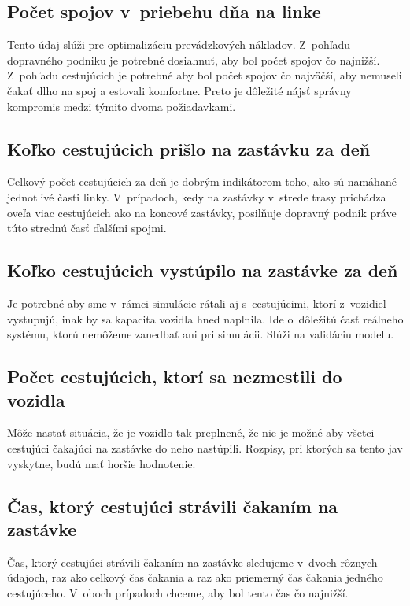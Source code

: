 \subsection*{Počet spojov v~priebehu dňa na linke}
Tento údaj slúži pre optimalizáciu prevádzkových nákladov. Z~pohľadu dopravného podniku je potrebné dosiahnuť, aby bol počet spojov čo najnižší.
Z~pohľadu cestujúcich je potrebné aby bol počet spojov čo najväčší, aby nemuseli čakať dlho na spoj a estovali komfortne.
Preto je dôležité nájsť správny kompromis medzi týmito dvoma požiadavkami.

\subsection*{Koľko cestujúcich prišlo na zastávku za deň}
Celkový počet cestujúcich za deň je dobrým indikátorom toho, ako sú namáhané jednotlivé časti linky.
V~prípadoch, kedy na zastávky v~strede trasy prichádza oveľa viac cestujúcich ako na koncové zastávky, posilňuje dopravný podnik práve túto strednú časť ďalšími spojmi.

\subsection*{Koľko cestujúcich vystúpilo na zastávke za deň}
Je potrebné aby sme v~rámci simulácie rátali aj s~cestujúcimi, ktorí z~vozidiel vystupujú, inak by sa kapacita vozidla hneď naplnila.
Ide o~dôležitú časť reálneho systému, ktorú nemôžeme zanedbať ani pri simulácii.
Slúži na validáciu modelu.

\subsection*{Počet cestujúcich, ktorí sa nezmestili do vozidla}
Môže nastať situácia, že je vozidlo tak preplnené, že nie je možné aby všetci cestujúci čakajúci na zastávke do neho nastúpili.
Rozpisy, pri ktorých sa tento jav vyskytne, budú mať horšie hodnotenie.

\subsection*{Čas, ktorý cestujúci strávili čakaním na zastávke}
Čas, ktorý cestujúci strávili čakaním na zastávke sledujeme v~dvoch rôznych údajoch, raz ako celkový čas čakania a raz ako priemerný čas čakania jedného cestujúceho.
V~oboch prípadoch chceme, aby bol tento čas čo najnižší.

